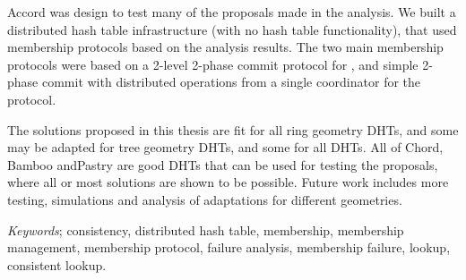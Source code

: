 \documentclass[a4paper,11pt]{article}
\begin{document}
Accord was design to test many of the proposals made in the analysis. We built a
 distributed hash table infrastructure (with no hash table functionality), that used
 membership protocols based on the analysis results. The two main membership protocols were based
 on a 2-level 2-phase commit protocol for , and simple 2-phase commit with
 distributed operations from a single coordinator for the  protocol.

The solutions proposed in this thesis are fit for all ring geometry DHTs, and some may
 be adapted for tree geometry DHTs, and some for all DHTs. All of Chord, Bamboo andPastry are
 good DHTs that can be used for testing the proposals, where all or most solutions are
 shown to be possible. Future work includes more testing, simulations and analysis
 of adaptations for different geometries.

\emph{Keywords}; consistency, distributed hash table, membership, membership management,
 membership protocol, failure analysis, membership failure, lookup, consistent lookup.

\pagebreak

\tableofcontents


\listoftables

\listoffigures








\appendix



\pagebreak


\end{document}
